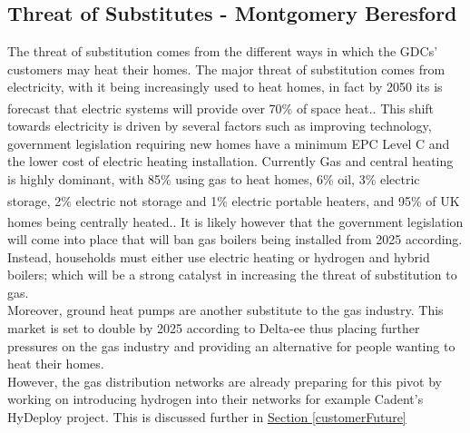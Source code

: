 \documentclass[11pt]{article}		%
\newcommand{\supercite}[1]{\textsuperscript{\cite{#1}}}		%
\newcommand{\sectref}[1]{\hyperref[#1]{Section \ref*{#1}}}     %
\begin{document}
        \subsection[Threat of Substitutes]{Threat of Substitutes - Montgomery Beresford} \label{customerSubstitutes}
                The threat of substitution comes from the different ways in which the GDCs’ customers may heat their homes. The major threat of substitution comes from electricity, with it being increasingly used to heat homes, in fact by 2050 its is forecast that electric systems will provide over 70\% of space heat.\supercite{heating_tech}.  This shift towards electricity is driven by several factors such as improving technology, government legislation requiring new homes have a minimum EPC Level C and the lower cost of electric heating installation. Currently Gas and central heating is highly dominant, with 85\% using gas to heat homes, 6\% oil, 3\% electric storage, 2\% electric not storage and 1\% electric portable heaters\supercite{heating}, and  95\% of UK homes being centrally heated.\supercite{central_heating}. It is likely however that the government legislation will come into place that will ban gas boilers being installed from 2025 according. Instead, households must either use electric heating or hydrogen and hybrid boilers; which will be a strong catalyst in increasing the threat of substitution to gas. 
                \\ \hspace*{3ex}
                Moreover, ground heat pumps are another substitute to the gas industry. This market is set to double by 2025 according to Delta-ee thus placing further pressures on the gas industry and providing an alternative for people wanting to heat their homes.%
                \\ \hspace*{3ex}
                However, the gas distribution networks are already preparing for this pivot by working on introducing hydrogen into their networks for example Cadent’s HyDeploy project. This is discussed further in \sectref{customerFuture}
\end{document}
